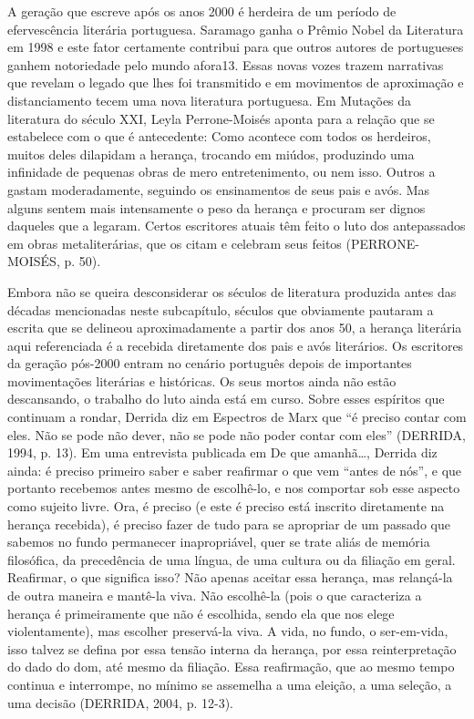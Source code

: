 \documentclass[../DISSERTACAO_MAIN.tex]{subfiles}
\begin{document}
A geração que escreve após os anos 2000 é herdeira de um período de efervescência literária portuguesa. Saramago ganha o Prêmio Nobel da Literatura em 1998 e este fator certamente contribui para que outros autores de portugueses ganhem notoriedade pelo mundo afora13. Essas novas vozes trazem narrativas que revelam o legado que lhes foi transmitido e em movimentos de aproximação e distanciamento tecem uma nova literatura portuguesa. Em Mutações da literatura do século XXI, Leyla Perrone-Moisés aponta para a relação que se estabelece com o que é antecedente: 
Como acontece com todos os herdeiros, muitos deles dilapidam a herança, trocando em miúdos, produzindo uma infinidade de pequenas obras de mero entretenimento, ou nem isso. Outros a gastam moderadamente, seguindo os ensinamentos de seus pais e avós. Mas alguns sentem mais intensamente o peso da herança e procuram ser dignos daqueles que a legaram. Certos escritores atuais têm feito o luto dos antepassados em obras metaliterárias, que os citam e celebram seus feitos (PERRONE-MOISÉS, p. 50).

Embora não se queira desconsiderar os séculos de literatura produzida antes das décadas mencionadas neste subcapítulo, séculos que obviamente pautaram a escrita que se delineou aproximadamente a partir dos anos 50, a herança literária aqui referenciada é a recebida diretamente dos pais e avós literários. Os escritores da geração pós-2000 entram no cenário português depois de importantes movimentações literárias e históricas. Os seus mortos ainda não estão descansando, o trabalho do luto ainda está em curso. Sobre esses espíritos que continuam a rondar, Derrida diz em Espectros de Marx que “é preciso contar com eles. Não se pode não dever, não se pode não poder contar com eles” (DERRIDA, 1994, p. 13). Em uma entrevista publicada em De que amanhã…, Derrida diz ainda:
é preciso primeiro saber e saber reafirmar o que vem “antes de nós”, e que portanto recebemos antes mesmo de escolhê-lo, e nos comportar sob esse aspecto como sujeito livre. Ora, é preciso (e este é preciso está inscrito diretamente na herança recebida), é preciso fazer de tudo para se apropriar de um passado que sabemos no fundo permanecer inapropriável, quer se trate aliás de memória filosófica, da precedência de uma língua, de uma cultura ou da filiação em geral. Reafirmar, o que significa isso? Não apenas aceitar essa herança, mas relançá-la de outra maneira e mantê-la viva. Não escolhê-la (pois o que caracteriza a herança é primeiramente que não é escolhida, sendo ela que nos elege violentamente), mas escolher preservá-la viva. A vida, no fundo, o ser-em-vida, isso talvez se defina por essa tensão interna da herança, por essa reinterpretação do dado do dom, até mesmo da filiação. Essa reafirmação, que ao mesmo tempo continua e interrompe, no mínimo se assemelha a uma eleição, a uma seleção, a uma decisão (DERRIDA, 2004, p. 12-3).
\end{document}
